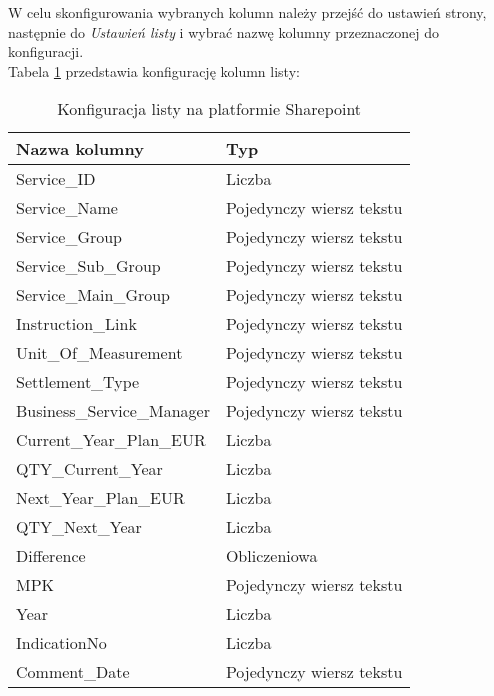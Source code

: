 W celu skonfigurowania wybranych kolumn należy przejść do ustawień strony, następnie do \emph{Ustawień listy} i wybrać nazwę kolumny przeznaczonej do konfiguracji.\\
Tabela \ref{tab:SharepointList} przedstawia konfigurację kolumn listy:
\begin{table}[h]
    \centering
    \caption{Konfiguracja listy na platformie Sharepoint}
    \label{tab:SharepointList}
    \begin{tabular}{|l|l|}
        \hline
        \textbf{Nazwa kolumny}     & \textbf{Typ}             \\ \hline
        Service\_ID                & Liczba                   \\ \hline
        Service\_Name              & Pojedynczy wiersz tekstu \\ \hline
        Service\_Group             & Pojedynczy wiersz tekstu \\ \hline
        Service\_Sub\_Group        & Pojedynczy wiersz tekstu \\ \hline
        Service\_Main\_Group       & Pojedynczy wiersz tekstu \\ \hline
        Instruction\_Link          & Pojedynczy wiersz tekstu \\ \hline
        Unit\_Of\_Measurement      & Pojedynczy wiersz tekstu \\ \hline
        Settlement\_Type           & Pojedynczy wiersz tekstu \\ \hline
        Business\_Service\_Manager & Pojedynczy wiersz tekstu \\ \hline
        Current\_Year\_Plan\_EUR   & Liczba                   \\ \hline
        QTY\_Current\_Year         & Liczba                   \\ \hline
        Next\_Year\_Plan\_EUR      & Liczba                   \\ \hline
        QTY\_Next\_Year            & Liczba                   \\ \hline
        Difference                 & Obliczeniowa             \\ \hline
        MPK                        & Pojedynczy wiersz tekstu \\ \hline
        Year                       & Liczba                   \\ \hline
        IndicationNo               & Liczba                   \\ \hline
        Comment\_Date              & Pojedynczy wiersz tekstu \\ \hline

\end{tabular}
\end{table}
